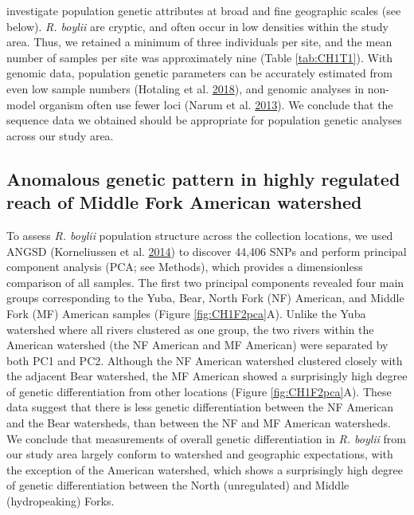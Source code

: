 \documentclass[proquest,12pt,final]{ucthesis-CA2012} %
\begin{document}
\begin{ucmainmatter}
investigate population genetic attributes at broad and fine geographic
scales (see below). \emph{R. boylii} are cryptic, and often occur in low
densities within the study area. Thus, we retained a minimum of three
individuals per site, and the mean number of samples per site was
approximately nine (Table \ref{tab:CH1T1}). With genomic data,
population genetic parameters can be accurately estimated from even low
sample numbers (Hotaling et al.
\protect\hyperlink{ref-hotaling_demographic_2018}{2018}), and genomic
analyses in non-model organism often use fewer loci (Narum et al.
\protect\hyperlink{ref-narum_genotyping-by-sequencing_2013}{2013}). We
conclude that the sequence data we obtained should be appropriate for
population genetic analyses across our study area.

\hypertarget{anomalous-genetic-pattern-in-highly-regulated-reach-of-middle-fork-american-watershed}{%
\subsection{Anomalous genetic pattern in highly regulated reach of
Middle Fork American
watershed}\label{anomalous-genetic-pattern-in-highly-regulated-reach-of-middle-fork-american-watershed}}

To assess \emph{R. boylii} population structure across the collection
locations, we used ANGSD (Korneliussen et al.
\protect\hyperlink{ref-korneliussen_angsd_2014}{2014}) to discover
44,406 SNPs and perform principal component analysis (PCA; see Methods),
which provides a dimensionless comparison of all samples. The first two
principal components revealed four main groups corresponding to the
Yuba, Bear, North Fork (NF) American, and Middle Fork (MF) American
samples (Figure \ref{fig:CH1F2pca}A). Unlike the Yuba watershed where
all rivers clustered as one group, the two rivers within the American
watershed (the NF American and MF American) were separated by both PC1
and PC2. Although the NF American watershed clustered closely with the
adjacent Bear watershed, the MF American showed a surprisingly high
degree of genetic differentiation from other locations (Figure
\ref{fig:CH1F2pca}A). These data suggest that there is less genetic
differentiation between the NF American and the Bear watersheds, than
between the NF and MF American watersheds. We conclude that measurements
of overall genetic differentiation in \emph{R. boylii} from our study
area largely conform to watershed and geographic expectations, with the
exception of the American watershed, which shows a surprisingly high
degree of genetic differentiation between the North (unregulated) and
Middle (hydropeaking) Forks.





\end{ucmainmatter}
\end{document}
